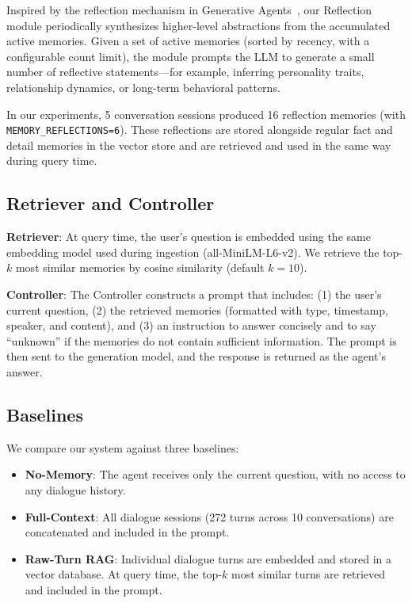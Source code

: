 \documentclass[11pt]{article}
\begin{document}
Inspired by the reflection mechanism in Generative Agents~\cite{park2023generative}, our Reflection module periodically synthesizes higher-level abstractions from the accumulated active memories. Given a set of active memories (sorted by recency, with a configurable count limit), the module prompts the LLM to generate a small number of reflective statements---for example, inferring personality traits, relationship dynamics, or long-term behavioral patterns.

In our experiments, 5 conversation sessions produced 16 reflection memories (with \texttt{MEMORY\_REFLECTIONS=6}). These reflections are stored alongside regular fact and detail memories in the vector store and are retrieved and used in the same way during query time.

\subsection{Retriever and Controller}

\textbf{Retriever}: At query time, the user's question is embedded using the same embedding model used during ingestion (all-MiniLM-L6-v2). We retrieve the top-$k$ most similar memories by cosine similarity (default $k=10$).

\textbf{Controller}: The Controller constructs a prompt that includes: (1) the user's current question, (2) the retrieved memories (formatted with type, timestamp, speaker, and content), and (3) an instruction to answer concisely and to say ``unknown'' if the memories do not contain sufficient information. The prompt is then sent to the generation model, and the response is returned as the agent's answer.

\subsection{Baselines}

We compare our system against three baselines:
\begin{itemize}
    \item \textbf{No-Memory}: The agent receives only the current question, with no access to any dialogue history.
    \item \textbf{Full-Context}: All dialogue sessions (272 turns across 10 conversations) are concatenated and included in the prompt.
    \item \textbf{Raw-Turn RAG}: Individual dialogue turns are embedded and stored in a vector database. At query time, the top-$k$ most similar turns are retrieved and included in the prompt.
\end{itemize}
\end{document}
